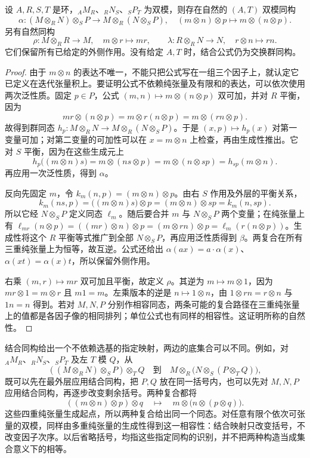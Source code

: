 \begin{theorem}[结合与单位同构]\label{b2:thm:tensor-associativity-unit}
	设 \(A,R,S,T\) 是环，\({}_AM_R\)、\({}_RN_S\)、\({}_SP_T\) 为双模，则存在自然的 \((A,T)\) 双模同构
	\[
		\alpha:(M\otimes_RN)\otimes_SP\longrightarrow M\otimes_R(N\otimes_SP), \quad (m\otimes n)\otimes p\longmapsto m\otimes(n\otimes p).
	\]
	另有自然同构
	\[
		\rho:M\otimes_RR\longrightarrow M,\quad m\otimes r\longmapsto mr, \qquad \lambda:R\otimes_RN\longrightarrow N,\quad r\otimes n\longmapsto rn.
	\]
	它们保留所有已给定的外侧作用。没有给定 \(A,T\) 时，结合公式仍为交换群同构。
\end{theorem}
\begin{proof}
	由于 \(m\otimes n\) 的表达不唯一，不能只把公式写在一组三个因子上，就认定它已定义在迭代张量积上。要证明公式不依赖纯张量及有限和的表达，可以依次使用两次泛性质。固定 \(p\in P\)，公式 \((m,n)\mapsto m\otimes(n\otimes p)\) 双可加，并对 \(R\) 平衡，因为
	\[
		mr\otimes(n\otimes p)=m\otimes r(n\otimes p) =m\otimes(rn\otimes p).
	\]
	故得到群同态 \(h_p:M\otimes_RN\to M\otimes_R(N\otimes_SP)\)。于是 \((x,p)\mapsto h_p(x)\) 对第一变量可加；对第二变量的可加性可以在 \(x=m\otimes n\) 上检查，再由生成性推出。它对 \(S\) 平衡，因为在这些生成元上
	\[
		h_p\bigl((m\otimes n)s\bigr) =m\otimes(ns\otimes p)=m\otimes(n\otimes sp)=h_{sp}(m\otimes n).
	\]
	再应用一次泛性质，得到 \(\alpha\)。

	反向先固定 \(m\)，令 \(k_m(n,p)=(m\otimes n)\otimes p\)。由右 \(S\) 作用及外层的平衡关系，
	\[
		k_m(ns,p)=\bigl((m\otimes n)s\bigr)\otimes p =(m\otimes n)\otimes sp=k_m(n,sp).
	\]
	所以它经 \(N\otimes_SP\) 定义同态 \(\ell_m\)。随后要合并 \(m\) 与 \(N\otimes_SP\) 两个变量；在纯张量上有 \(\ell_{mr}(n\otimes p)=((mr)\otimes n)\otimes p=(m\otimes rn)\otimes p=\ell_m(r(n\otimes p))\)。生成性将这个 \(R\) 平衡等式推广到全部 \(N\otimes_SP\)，再应用泛性质得到 \(\beta\)。两复合在所有三重纯张量上为恒等，故互逆。公式还给出 \(\alpha(ax)=a\cdot\alpha(x)\)、\(\alpha(xt)=\alpha(x)t\)，所以保留外侧作用。

	右乘 \((m,r)\mapsto mr\) 双可加且平衡，故定义 \(\rho\)。其逆为 \(m\mapsto m\otimes1\)，因为 \(mr\otimes1=m\otimes r\) 且 \(m1=m\)。左乘版本的逆是 \(n\mapsto1\otimes n\)，由 \(1\otimes rn=r\otimes n\) 与 \(1n=n\) 得到。若对 \(M,N,P\) 分别作相容同态，两条可能的复合路径在三重纯张量上的值都是各因子像的相同排列；单位公式也有同样的相容性。这证明所称的自然性。
\end{proof}

结合同构给出一个不依赖选基的指定映射，两边的底集合可以不同。例如，对 \({}_AM_R\)、\({}_RN_S\)、\({}_SP_T\) 及左 \(T\) 模 \(Q\)，从
\[
	((M\otimes_RN)\otimes_SP)\otimes_TQ \quad\text{到}\quad M\otimes_R\bigl(N\otimes_S(P\otimes_TQ)\bigr),
\]
既可以先在最外层应用结合同构，把 \(P,Q\) 放在同一括号内，也可以先对 \(M,N,P\) 应用结合同构，再逐步改变剩余括号。两种复合都将
\[
	((m\otimes n)\otimes p)\otimes q \quad\longmapsto\quad m\otimes\bigl(n\otimes(p\otimes q)\bigr).
\]
这些四重纯张量生成起点，所以两种复合给出同一个同态。对任意有限个依次可张量的双模，同样由多重纯张量的生成性得到这一相容性：结合映射只改变括号，不改变因子次序。以后省略括号，均指这些指定同构的识别，并不把两种构造当成集合意义下的相等。

